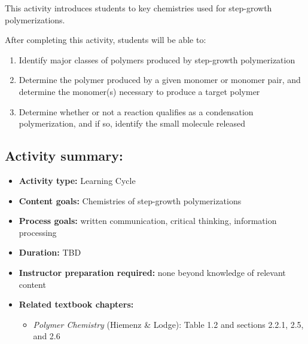 %
%
%
%

\renewcommand{\figpath}{content/polymchem/stepgrowth/stepgrowth-chemistries/figs}

\begin{activity}

\begin{instructornotes}

	This activity introduces students to key chemistries used for step-growth polymerizations.
	
	After completing this activity, students will be able to:
			\begin{enumerate}
				\item Identify major classes of polymers produced by step-growth polymerization
				\item Determine the polymer produced by a given monomer or monomer pair, and determine the monomer(s) necessary to produce a target polymer
				\item Determine whether or not a reaction qualifies as a condensation polymerization, and if so, identify the small molecule released
			\end{enumerate}
	
			
	\subsection*{Activity summary:}
	\begin{itemize}
		\item \textbf{Activity type:} Learning Cycle
		\item \textbf{Content goals:} Chemistries of step-growth polymerizations
		\item \textbf{Process goals:} %
			written communication, critical thinking, information processing
		\item \textbf{Duration:} TBD %
		\item \textbf{Instructor preparation required:} none beyond knowledge of relevant content
		\item \textbf{Related textbook chapters:}
			\begin{itemize}
				\item \emph{Polymer Chemistry} (Hiemenz \& Lodge): Table 1.2 and sections 2.2.1, 2.5, and 2.6
			\end{itemize}
	\end{itemize}


\end{instructornotes}
\end{activity}
